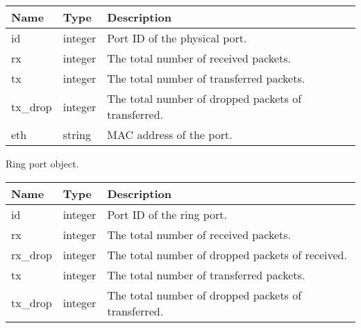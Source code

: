 \documentclass[a4paper,11pt,openany,oneside,english]{sphinxmanual}
\begin{document}
\begin{savenotes}\sphinxattablestart
\centering
{}
\sphinxthecaptionisattop
{}\label{\detokenize{api_ref/spp_primary:id34}}\label{\detokenize{api_ref/spp_primary:table-spp-ctl-primary-status-phy}}
\sphinxaftertopcaption
\begin{tabulary}{\linewidth}[t]{|T|T|T|}
\hline
\sphinxstyletheadfamily 
Name
&\sphinxstyletheadfamily 
Type
&\sphinxstyletheadfamily 
Description
\\
\hline
id
&
integer
&
Port ID of the physical port.
\\
\hline
rx
&
integer
&
The total number of received packets.
\\
\hline
tx
&
integer
&
The total number of transferred packets.
\\
\hline
tx\_drop
&
integer
&
The total number of dropped packets of transferred.
\\
\hline
eth
&
string
&
MAC address of the port.
\\
\hline
\end{tabulary}
\par
\sphinxattableend\end{savenotes}

Ring port object.


\begin{savenotes}\sphinxattablestart
\centering
{}
\sphinxthecaptionisattop
{}\label{\detokenize{api_ref/spp_primary:id35}}\label{\detokenize{api_ref/spp_primary:table-spp-ctl-primary-status-ring}}
\sphinxaftertopcaption
\begin{tabulary}{\linewidth}[t]{|T|T|T|}
\hline
\sphinxstyletheadfamily 
Name
&\sphinxstyletheadfamily 
Type
&\sphinxstyletheadfamily 
Description
\\
\hline
id
&
integer
&
Port ID of the ring port.
\\
\hline
rx
&
integer
&
The total number of received packets.
\\
\hline
rx\_drop
&
integer
&
The total number of dropped packets of received.
\\
\hline
tx
&
integer
&
The total number of transferred packets.
\\
\hline
tx\_drop
&
integer
&
The total number of dropped packets of transferred.
\\
\hline
\end{tabulary}
\par
\sphinxattableend\end{savenotes}
\end{document}
